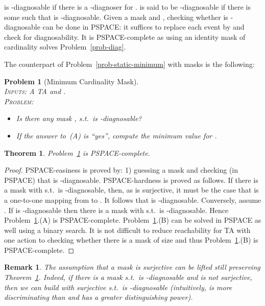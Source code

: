 \documentclass[letterpaper,10pt,conference]{ieeeconf}  \IEEEoverridecommandlockouts                              \overrideIEEEmargins
\def\st{{s.t.}~}
\newtheorem{prob}{Problem}  \newtheorem{definition}{Definition}
\newtheorem{theorem}{Theorem}
\newtheorem{remark}{Remark}
\begin{document}
 is -diagnosable if there is a
-diagnoser for .  is said to be
-diagnosable if there is some  such that  is
-diagnosable.  Given a mask  and , checking
whether  is -diagnosable can be done in PSPACE: it suffices
to replace each event  by  and check for
diagnosability. It is PSPACE-complete as using an identity mask of
cardinality  solves Problem~\ref{prob-diag}.

The counterpart of Problem~\ref{prob-static-minimum} with masks is the
following:

\begin{prob}[Minimum Cardinality Mask] \label{prob-static-mask} \mbox{} \\
  \textsc{Inputs:} A  TA  and . \\
  \textsc{Problem:}
  \begin{itemize}
  \item[(A)] Is there any mask , \st  is -diagnosable?
  \item[(B)] If the answer to~(A) is ``yes'', compute the minimum value for .
  \end{itemize}
\end{prob}
\begin{theorem}\label{thm-mask}
  Problem~\ref{prob-static-mask} is PSPACE-complete.
\end{theorem}
\begin{proof}
  PSPACE-easiness is proved by: 1) guessing a mask  and
  checking (in PSPACE) that  is -diagnosable.
  PSPACE-hardness is proved as follows.  If there is a mask 
  with  \st  is -diagnosable, then, as  is
  surjective, it must be the case that  is a one-to-one mapping
  from  to . It follows that
   is -diagnosable.  Conversely, assume
  .  If  is -diagnosable then
  there is a mask  with  \st  is
  -diagnosable.  Hence
  Problem~\ref{prob-static-mask}.(A) is PSPACE-complete.
  Problem~\ref{prob-static-mask}.(B) can be solved in PSPACE as well
  using a binary search. It is not difficult to reduce reachability
  for TA with one action to checking whether there is a mask of size
   and thus Problem~\ref{prob-static-mask}.(B) is PSPACE-complete.
\end{proof}
\begin{remark}
  The assumption that a mask is surjective can be lifted still
  preserving Theorem~\ref{thm-mask}. Indeed, if there is a mask
   \st  is -diagnosable and  is not
  surjective, then we can build  with  surjective
  \st  is -diagnosable (intuitively,  is more
  discriminating than  and has a greater distinguishing power).
\end{remark}
\end{document}
